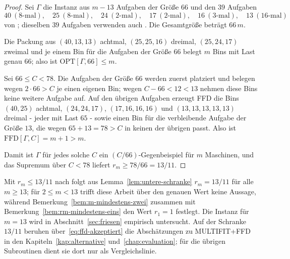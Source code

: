 \begin{proof}
Sei $\Gamma$ die Instanz aus $m-13$ Aufgaben der Größe $66$ und den $39$ Aufgaben
\[
  40\ (8\text{-mal}), \quad 25\ (8\text{-mal}), \quad 24\ (2\text{-mal}), \quad
  17\ (2\text{-mal}), \quad 16\ (3\text{-mal}), \quad 13\ (16\text{-mal})
\]
von \textcite{friesen1984}; dieselben $39$ Aufgaben verwenden auch
\textcite[Beispiel~1, S.~38]{friesen_langston1986}.
Die Gesamtgröße beträgt $66\,m$.

Die Packung aus $(40, 13, 13)$ achtmal, $(25, 25, 16)$ dreimal, $(25, 24, 17)$ zweimal und je
einem Bin für die Aufgaben der Größe $66$ belegt $m$ Bins mit Last genau $66$; also ist
$\mathrm{OPT}[\Gamma, 66] \le m$.

Sei $66 \le C < 78$.
Die Aufgaben der Größe $66$ werden zuerst platziert und belegen wegen $2 \cdot 66 > C$ je einen
eigenen Bin; wegen $C - 66 < 12 < 13$ nehmen diese Bins keine weitere Aufgabe auf.
Auf den übrigen Aufgaben erzeugt FFD die Bins $(40, 25)$ achtmal, $(24, 24, 17)$,
$(17, 16, 16, 16)$ und $(13, 13, 13, 13, 13)$ dreimal - jeder mit Last $65$ - sowie einen Bin
für die verbleibende Aufgabe der Größe $13$, die wegen $65 + 13 = 78 > C$ in keinen der übrigen
passt.
Also ist $\mathrm{FFD}[\Gamma, C] = m+1 > m$.

Damit ist $\Gamma$ für jedes solche $C$ ein $(C/66)$-Gegenbeispiel für $m$ Maschinen, und das
Supremum über $C < 78$ liefert $r_m \ge 78/66 = 13/11$.
\end{proof}

Mit $r_m \le 13/11$ nach \textcite{cao1995} folgt aus Lemma~\ref{lem:untere-schranke}
$r_m = 13/11$ für alle $m \ge 13$; für $2 \le m < 13$
trifft diese Arbeit über den genauen Wert keine Aussage, während
Bemerkung~\ref{bem:m-mindestens-zwei} zusammen mit
Bemerkung~\ref{bem:rm-mindestens-eins} den Wert $r_1 = 1$ festlegt.
Die Instanz für $m = 13$ wird in Abschnitt~\ref{sec:friesen} empirisch untersucht.
Auf der Schranke $13/11$ beruhen über~\eqref{eq:ffd-akzeptiert} die Abschätzungen zu
MULTIFIT+FFD in den Kapiteln~\ref{kap:alternative} und~\ref{chap:evaluation}; für die übrigen
Subroutinen dient sie dort nur als Vergleichslinie.
